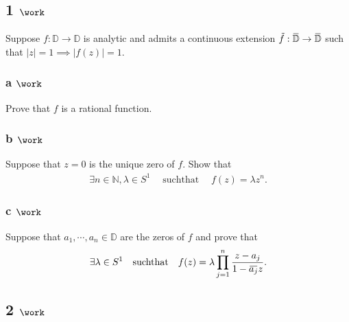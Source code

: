 \hypertarget{work-70}{%
\subsection{\texorpdfstring{1
\(\work\)}{1 \textbackslash work}}\label{work-70}}

Suppose \(f:{\mathbb{D}}\to{\mathbb{D}}\) is analytic and admits a
continuous extension
\(\tilde f: \mkern 1.5mu\overline{\mkern-1.5mu{\mathbb{D}}\mkern-1.5mu}\mkern 1.5mu\to \mkern 1.5mu\overline{\mkern-1.5mu{\mathbb{D}}\mkern-1.5mu}\mkern 1.5mu\)
such that
\({\left\lvert {z} \right\rvert} = 1 \implies {\left\lvert {f(z)} \right\rvert} = 1\).

\hypertarget{a-work-5}{%
\subsubsection{\texorpdfstring{a
\(\work\)}{a \textbackslash work}}\label{a-work-5}}

Prove that \(f\) is a rational function.

\hypertarget{b-work-7}{%
\subsubsection{\texorpdfstring{b
\(\work\)}{b \textbackslash work}}\label{b-work-7}}

Suppose that \(z=0\) is the unique zero of \(f\). Show that
\begin{align*}  
\exists n\in {\mathbb{N}}, \lambda \in S^1 {\quad \operatorname{ such that } \quad}f(z) = \lambda z^n
.\end{align*}

\hypertarget{c-work-5}{%
\subsubsection{\texorpdfstring{c
\(\work\)}{c \textbackslash work}}\label{c-work-5}}

Suppose that \(a_1, \cdots, a_n \in {\mathbb{D}}\) are the zeros of
\(f\) and prove that
\begin{align*}  
\exists \lambda \in S^1 {\quad \operatorname{such that} \quad} f(z) = \lambda \prod_{j=1}^n {z - a_j \over 1 - \mkern 1.5mu\overline{\mkern-1.5mua_j\mkern-1.5mu}\mkern 1.5mu z}
.\end{align*}

\hypertarget{work-71}{%
\subsection{\texorpdfstring{2
\(\work\)}{2 \textbackslash work}}\label{work-71}}

